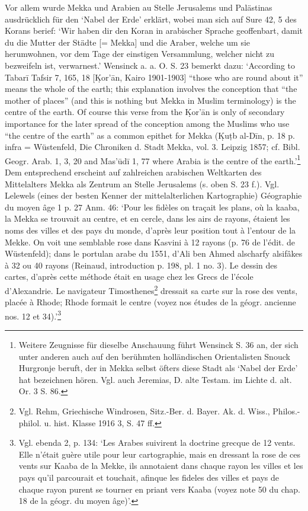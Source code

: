 \documentclass[a4paper, 11pt, oneside]{article}
\begin{document}
Vor allem wurde Mekka und Arabien au Stelle Jerusalems und Palästinas ausdrücklich für den `Nabel der Erde' erklärt, wobei man sich auf Sure 42, 5 des Korans berief: `Wir haben dir den Koran in arabischer Sprache geoffenbart, damit du die Mutter der Städte [= Mekka] und die Araber, welche um sie herumwohnen, vor dem Tage der einstigen Versammlung, welcher nicht zu bezweifeln ist, verwarnest.' Wensinck a. a. O. S. 23 bemerkt dazu: `According to Tabarī Tafsir 7, 165, 18 [\d{K}or'ān, Kairo 1901-1903] "`those who are round about it"' means the whole of the earth; this explanation involves the conception that "`the mother of places"' (and this is nothing but Mekka in Muslim terminology) is the centre of the earth. Of course this verse from the \d{K}or'ān is only of secondary importance for the later spread of the conception among the Muslims who use "`the centre of the earth"' as a common epithet for Mekka (\d{K}uṭb al-Dīn, p. 18 p. infra = Wüstenfeld, Die Chroniken d. Stadt Mekka, vol. 3. Leipzig 1857; cf. Bibl. Geogr. Arab. 1, 3, 20 and Mas'ūdī 1, 77 where Arabia is the centre of the earth.'\footnote{Weitere Zeugnisse für dieselbe Anschauung führt Wensinck S. 36 an, der sich unter anderen auch auf den berühmten holländischen Orientalisten Snouck Hurgronje beruft, der in Mekka selbst öfters diese Stadt als `Nabel der Erde' hat bezeichnen hören. Vgl. auch Jeremias, D. alte Testam. im Lichte d. alt. Or. 3 S. 86.} Dem entsprechend erscheint auf zahlreichen arabischen Weltkarten des Mittelalters Mekka als Zentrum an Stelle Jerusalems (s. oben S. 23 f.). Vgl. Lelewels (eines der besten Kenner der mittelalterlichen Kartographie) Géographie du moyen âge 1 p. 27 Anm. 46: `Pour les fidèles on traçait les plans, où la kaaba, la Mekka se trouvait au centre, et en cercle, dans les airs de rayons, étaient les noms des villes et des pays du monde, d'après leur position tout à l'entour de la Mekke. On voit une semblable rose dans Kasvini à 12 rayons (p. 76 de l'édit. de Wüstenfeld); dans le portulan arabe du 1551, d'Ali ben Ahmed alscharfy alsifâkes à 32 ou 40 rayons (Reinaud, introduction p. 198, pl. 1 no. 3). Le dessin des cartes, d'après cette méthode était en usage chez les Grecs de l'école d'Alexandrie. Le navigateur Timosthenes\footnote{Vgl. Rehm, Griechische Windrosen, Sitz.-Ber. d. Bayer. Ak. d. Wiss., Philos.-philol. u. hist. Klasse 1916 3, S. 47 ff.} dressait sa carte sur la rose des vents, placée à Rhode; Rhode formait le centre (voyez nos études de la géogr. ancienne nos. 12 et 34).'\footnote{Vgl. ebenda 2, p. 134: `Les Arabes suivirent la doctrine grecque de 12 vents. Elle n'était guère utile pour leur cartographie, mais en dressant la rose de ces vents sur Kaaba de la Mekke, ils annotaient dans chaque rayon les villes et les pays qu'il parcourait et touchait, afinque les fideles des villes et pays de chaque rayon purent se tourner en priant vers Kaaba (voyez note 50 du chap. 18 de la géogr. du moyen âge)'.}
\end{document}
